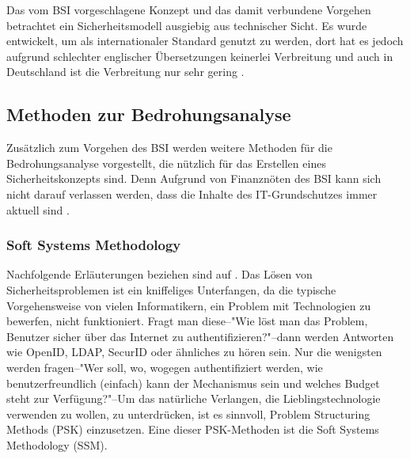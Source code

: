 \documentclass[11pt,a4paper]{report}
\begin{document}
Das vom BSI vorgeschlagene Konzept und das damit verbundene Vorgehen betrachtet ein Sicherheitsmodell ausgiebig aus technischer Sicht. Es wurde entwickelt, um als internationaler Standard genutzt zu werden, dort hat es jedoch aufgrund schlechter englischer Übersetzungen keinerlei Verbreitung und auch in Deutschland ist die Verbreitung nur sehr gering \cite{bsi_kritik}.


\subsection{Methoden zur Bedrohungsanalyse}

Zusätzlich zum Vorgehen des BSI werden weitere Methoden für die Bedrohungsanalyse vorgestellt, die nützlich für das Erstellen eines Sicherheitskonzepts sind. Denn Aufgrund von Finanznöten des BSI kann sich nicht darauf verlassen werden, dass die Inhalte des IT-Grund\-schutzes immer aktuell sind \cite{bsi_not}.

\subsubsection{Soft Systems Methodology} \label{sec:ssm}

Nachfolgende Erläuterungen beziehen sind auf \cite[s.~252]{gutmann}. 
Das Lösen von Sicherheitsproblemen ist ein kniffeliges Unterfangen, da die typische Vorgehensweise von vielen Informatikern, ein Problem mit Technologien zu bewerfen, nicht funktioniert. Fragt man diese--"Wie löst man das Problem, Benutzer sicher über das Internet zu authentifizieren?"--dann werden Antworten wie OpenID, LDAP, SecurID oder ähnliches zu hören sein. Nur die wenigsten werden fragen--"Wer soll, wo, wogegen authentifiziert werden, wie benutzerfreundlich (einfach) kann der Mechanismus sein und welches Budget steht zur Verfügung?"--Um das natürliche Verlangen, die Lieblingstechnologie verwenden zu wollen, zu unterdrücken, ist es sinnvoll, Problem Structuring Methods (PSK) einzusetzen. Eine dieser PSK-Methoden ist die Soft Systems Methodology (SSM).
\end{document}
